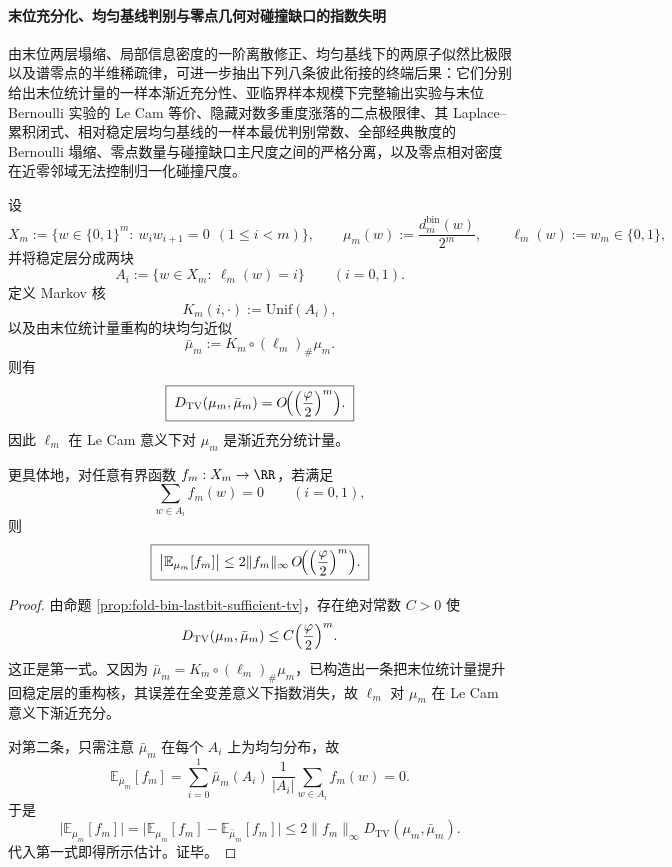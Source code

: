 \paragraph{末位充分化、均匀基线判别与零点几何对碰撞缺口的指数失明}
由末位两层塌缩、局部信息密度的一阶离散修正、均匀基线下的两原子似然比极限以及谱零点的半维稀疏律，可进一步抽出下列八条彼此衔接的终端后果：它们分别给出末位统计量的一样本渐近充分性、亚临界样本规模下完整输出实验与末位 Bernoulli 实验的 Le Cam 等价、隐藏对数多重度涨落的二点极限律、其 Laplace--累积闭式、相对稳定层均匀基线的一样本最优判别常数、全部经典散度的 Bernoulli 塌缩、零点数量与碰撞缺口主尺度之间的严格分离，以及零点相对密度在近零邻域无法控制归一化碰撞尺度。

\begin{theorem}[末位统计量的渐近充分性]\label{thm:xi-fold-lastbit-asymptotic-sufficiency}
设
\[
X_m:=\{w\in\{0,1\}^m:\ w_iw_{i+1}=0\ \ (1\le i<m)\},
\qquad
\mu_m(w):=\frac{d_m^{\mathrm{bin}}(w)}{2^m},
\qquad
\ell_m(w):=w_m\in\{0,1\},
\]
并将稳定层分成两块
\[
A_i:=\{w\in X_m:\ \ell_m(w)=i\}
\qquad(i=0,1).
\]
定义 Markov 核
\[
K_m(i,\cdot):=\mathrm{Unif}(A_i),
\]
以及由末位统计量重构的块均匀近似
\[
\bar\mu_m:=K_m\circ (\ell_m)_\#\mu_m.
\]
则有
\[
\boxed{\;
D_{\mathrm{TV}}(\mu_m,\bar\mu_m)
=
O\!\Bigl(\Bigl(\frac{\varphi}{2}\Bigr)^m\Bigr).\;}
\]
因此 \(\ell_m\) 在 Le Cam 意义下对 \(\mu_m\) 是渐近充分统计量。

更具体地，对任意有界函数 \(f_m:X_m\to\RR\)，若满足
\[
\sum_{w\in A_i}f_m(w)=0
\qquad(i=0,1),
\]
则
\[
\boxed{\;
\bigl|\mathbb E_{\mu_m}[f_m]\bigr|
\le
2\|f_m\|_\infty\,
O\!\Bigl(\Bigl(\frac{\varphi}{2}\Bigr)^m\Bigr).\;}
\]
\end{theorem}
\begin{proof}
由命题 \ref{prop:fold-bin-lastbit-sufficient-tv}，存在绝对常数 \(C>0\) 使
\[
D_{\mathrm{TV}}(\mu_m,\bar\mu_m)\le C\Bigl(\frac{\varphi}{2}\Bigr)^m.
\]
这正是第一式。又因为 \(\bar\mu_m=K_m\circ(\ell_m)_\#\mu_m\)，已构造出一条把末位统计量提升回稳定层的重构核，其误差在全变差意义下指数消失，故 \(\ell_m\) 对 \(\mu_m\) 在 Le Cam 意义下渐近充分。

对第二条，只需注意 \(\bar\mu_m\) 在每个 \(A_i\) 上为均匀分布，故
\[
\mathbb E_{\bar\mu_m}[f_m]
=
\sum_{i=0}^{1}\bar\mu_m(A_i)\,\frac{1}{|A_i|}\sum_{w\in A_i}f_m(w)=0.
\]
于是
\[
\bigl|\mathbb E_{\mu_m}[f_m]\bigr|
=
\bigl|\mathbb E_{\mu_m}[f_m]-\mathbb E_{\bar\mu_m}[f_m]\bigr|
\le
2\|f_m\|_\infty D_{\mathrm{TV}}(\mu_m,\bar\mu_m).
\]
代入第一式即得所示估计。证毕。
\end{proof}

